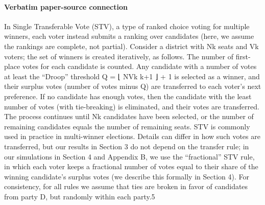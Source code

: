 \documentclass[10pt]{article}
\begin{document}
\paragraph{Verbatim paper-source connection}
\begin{ReviewVerbatim}
In Single Transferable Vote (STV), a type of ranked choice voting for multiple winners, each
voter instead submits a ranking over candidates (here, we assume the rankings are complete, not
partial). Consider a district with Nk seats and Vk voters; the set of winners is created iteratively, as
follows. The number of first-place votes for each candidate is counted. Any candidate with a number
of votes at least the “Droop” threshold Q = ⌊ NVk k+1 ⌋ + 1 is selected as a winner, and their surplus
votes (number of votes minus Q) are transferred to each voter’s next preference. If no candidate has
enough votes, then the candidate with the least number of votes (with tie-breaking) is eliminated,
and their votes are transferred. The process continues until Nk candidates have been selected, or
the number of remaining candidates equals the number of remaining seats. STV is commonly used
in practice in multi-winner elections.
    Details can differ in how such votes are transferred, but our results in Section 3 do not depend
on the transfer rule; in our simulations in Section 4 and Appendix B, we use the “fractional” STV
rule, in which each voter keeps a fractional number of votes equal to their share of the winning
candidate’s surplus votes (we describe this formally in Section 4). For consistency, for all rules we
assume that ties are broken in favor of candidates from party D, but randomly within each party.5
\end{ReviewVerbatim}
\end{document}
